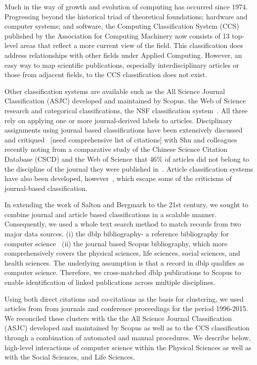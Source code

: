 Much in the way of growth and evolution of computing has occurred since 1974. Progressing beyond the historical triad of theoretical foundations; hardware and computer systems; and software, the Computing Classification System (CCS)~\cite{acm_ref} published by the Association for Computing Machinery now consists of 13 top-level areas that reflect a more current view of the field. This classification does address relationships with other fields under Applied Computing. However, an easy way to map scientific publications, especially interdisciplinary articles or those from adjacent fields, to the CCS classification does not exist. 

Other classification systems are available such as the All Science Journal Classification (ASJC) developed and maintained by Scopus. the Web of Science research and categorical classifications, the NSF classification system~\cite{nsf_classification}. All three rely on applying one or more journal-derived labels to articles. Disciplinary assignments using journal based classifications have been extensively discussed and critiqued~\cite{wang_large-scale_2016} [need comprehensive list of citations] with Shu and colleagues recently noting from a comparative study of the Chinese Science Citation Database (CSCD) and the Web of Science that 46\% of articles did not belong to the discipline of the journal they were published in~\cite{shu_comparing_2019}. Article classification systems have also been developed, however~\cite{traag_louvain_2019,boyack_classification_2014,waltman_new_2012}, which escape some of the criticisms of journal-based classification.

In extending the work of Salton and Bergmark to the 21st century, we sought to combine journal and article based classifications in a scalable manner. Consequently, we used a whole text search method to match records from two major data sources. (i) the dblp bibliography- a reference bibliography for computer science~\cite{dblp_ref} (ii) the journal based Scopus bibliography, which more comprehensively covers the physical sciences, life sciences, social sciences, and health sciences. The underlying assumption is that a record in dblp qualifies as computer science. Therefore, we cross-matched dblp publications to Scopus to  enable identification of linked publications across multiple disciplines.

Using both direct citations and co-citations as the basis for clustering, we used articles from from journals and conference proceedings for the period 1996-2015. We reconciled these clusters with the the All Science Journal Classification (ASJC) developed and maintained by Scopus as well as to the CCS classification through a combination of automated and manual procedures. We describe below, high-level interactions of computer science within the Physical Sciences as well as with the Social Sciences, and Life Sciences. 

